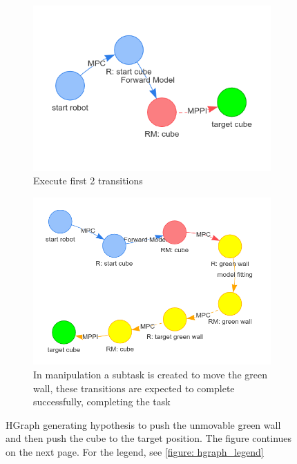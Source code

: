 \begin{figure}[H]
     \begin{subfigure}[b]{0.49\textwidth}
         \centering
         \includegraphics[width=\textwidth]{figures/blockade/3.png}
         \caption{Execute first 2 transitions}
     \end{subfigure}
     \hfill
     \begin{subfigure}[b]{0.49\textwidth}
         \centering
         \includegraphics[width=\textwidth]{figures/blockade/4.png}
         \caption{In manipulation a subtask is created to move the green wall, these transitions are expected to complete successfully, completing the task}
     \end{subfigure}
     \caption{HGraph generating hypothesis to push the unmovable green wall and then push the cube to the target position. The figure continues on the next page. For the legend, see \cref{figure: hgraph_legend}}
     \label{figure: blockade_hgraph_first}
\end{figure}

